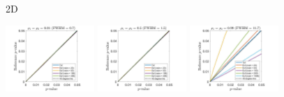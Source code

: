 \documentclass{article}
\begin{document}
\begin{figure}[!htp]
\centering
\begin{sideways}
\phantom{------------------}2D
\end{sideways}
\includegraphics[trim=80 5 80 5, clip,width=0.3\textwidth]{figure/2D_rho1_0.01_rho2_0.01.jpg}
\includegraphics[trim=80 5 80 5, clip,width=0.3\textwidth]{figure/2D_rho1_0.5_rho2_0.5.jpg}
\includegraphics[trim=80 5 80 5, clip,width=0.3\textwidth]{figure/2D_rho1_0.99_rho2_0.99.jpg}


\end{figure}
\end{document}
